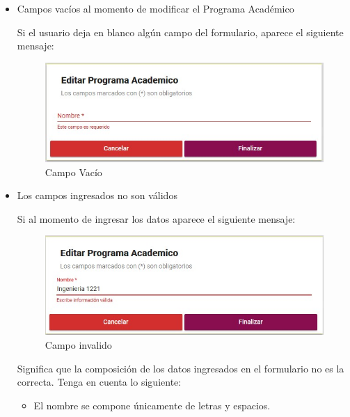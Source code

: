             \begin{itemize}
                \item Campos vacíos al momento de modificar el Programa Académico

                    Si el usuario deja en blanco algún campo del formulario, aparece el siguiente mensaje:

                    \begin{figure}[H]
                    \centering
                    \hypertarget{vacio}{\includegraphics[width=0.7\linewidth]{images/SP3/Vacio}}
                    \caption{Campo Vacío}
                    \label{vacio}
                    \end{figure}

                \item Los campos ingresados no son válidos

                    Si al momento de ingresar los datos aparece el siguiente mensaje:

                     \begin{figure}[H]
                    \centering
                    \hypertarget{invalido}{\includegraphics[width=0.7\linewidth]{images/SP3/Invalida}}
                    \caption{Campo invalido}
                    \label{invalido}
                    \end{figure}


                    Significa que la composición de los datos ingresados en el formulario no es la correcta. Tenga en cuenta lo siguiente:

                    \begin{itemize}
                        \item El nombre se compone  únicamente de letras y espacios.


\end{itemize}
\end{itemize}
